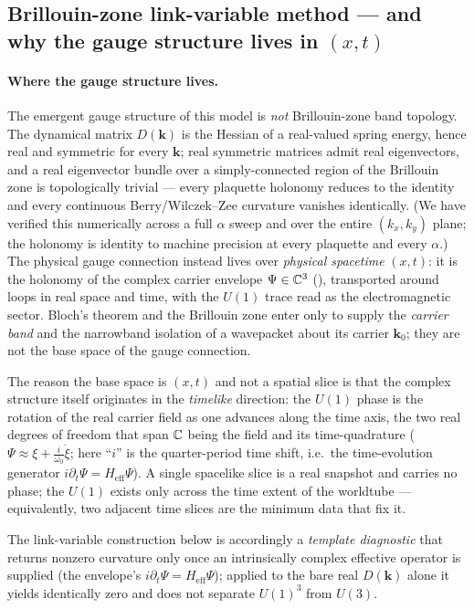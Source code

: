 \subsection{Brillouin-zone link-variable method --- and why the gauge structure lives in $(x,t)$}
\label{subsec:bz-berry}

\paragraph{Where the gauge structure lives.}
The emergent gauge structure of this model is \emph{not} Brillouin-zone band topology.
The dynamical matrix $D(\mathbf{k})$ is the Hessian of a real-valued spring energy, hence
real and symmetric for every $\mathbf{k}$; real symmetric matrices admit real eigenvectors,
and a real eigenvector bundle over a simply-connected region of the Brillouin zone is
topologically trivial --- every plaquette holonomy reduces to the identity and every continuous
Berry/Wilczek--Zee curvature vanishes identically.
(We have verified this numerically across a full $\alpha$ sweep and over the entire
$(k_x,k_y)$ plane; the holonomy is identity to machine precision at every plaquette and every
$\alpha$.)
The physical gauge connection instead lives over \emph{physical spacetime} $(x,t)$: it is the
holonomy of the complex carrier envelope $\Psi\in\mathbb{C}^3$ (), transported
around loops in real space and time, with the $U(1)$ trace read as the electromagnetic sector.
Bloch's theorem and the Brillouin zone enter only to supply the \emph{carrier band} and the
narrowband isolation of a wavepacket about its carrier $\mathbf{k}_0$; they are not the base
space of the gauge connection.

The reason the base space is $(x,t)$ and not a spatial slice is that the complex structure
itself originates in the \emph{timelike} direction: the $U(1)$ phase is the rotation of the
real carrier field as one advances along the time axis, the two real degrees of freedom that
span $\mathbb{C}$ being the field and its time-quadrature
($\Psi\approx\xi+\tfrac{i}{\omega_0}\dot\xi$; here ``$i$'' is the quarter-period time shift,
i.e.\ the time-evolution generator $i\partial_t\Psi=H_{\mathrm{eff}}\Psi$). A single spacelike
slice is a real snapshot and carries no phase; the $U(1)$ exists only across the time extent of
the worldtube --- equivalently, two adjacent time slices are the minimum data that fix it.

The link-variable construction below is accordingly a \emph{template diagnostic} that returns
nonzero curvature only once an intrinsically complex effective operator is supplied (the
envelope's $i\partial_t\Psi=H_{\mathrm{eff}}\Psi$); applied to the bare real $D(\mathbf{k})$
alone it yields identically zero and does not separate $U(1)^3$ from $U(3)$.

